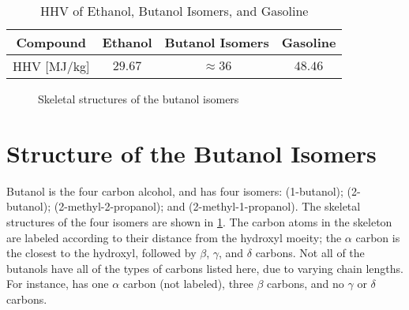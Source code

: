 \documentclass[../main.tex]{subfiles}
\begin{document}
\begin{table}[!ht]
    \caption{HHV of Ethanol, Butanol Isomers, and Gasoline}
    \label{tab:buoh-heats}
    \begin{tabular}{*{4}{c}}
        \toprule
        Compound & Ethanol \cite{Afeefy2014} & Butanol Isomers \cite{Afeefy2014} & Gasoline \cite{Davis2013} \\
        \midrule
        HHV [\si[per-mode = symbol]{\mega\joule\per\kilo\gram}] & $29.67$ & $\approx 36$ & $48.46$ \\
        \bottomrule
    \end{tabular}
\end{table}

\begin{figure}[!ht]
    {\caption{Skeletal structures of the butanol isomers}
    \label{fig:buoh-isomers}}
\end{figure}

\section{Structure of the Butanol Isomers}
\label{sec:butanol-isomers}

Butanol is the four carbon alcohol, and has four isomers:
\nBuOH{} (1-butanol);
\sBuOH{} (2-butanol);
\tBuOH{} (2-methyl-2-propanol); and
\iBuOH{} (2-methyl-1-propanol).
The skeletal structures of the four isomers are shown in
\cref{fig:buoh-isomers}. The carbon atoms in the skeleton are
labeled according to their distance from the hydroxyl moeity; the
$\alpha$ carbon is the closest to the hydroxyl, followed by $\beta$,
$\gamma$, and $\delta$ carbons. Not all of the butanols have all of
the types of carbons listed here, due to varying chain lengths. For
instance, \tBuOH{} has one $\alpha$ carbon (not labeled), three $\beta$
carbons, and no $\gamma$ or $\delta$ carbons.
\end{document}
